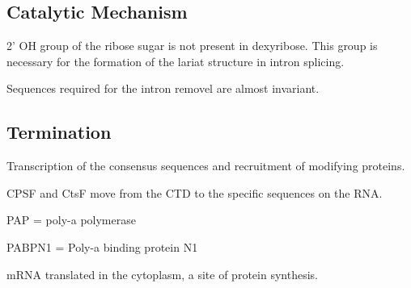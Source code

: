 \documentclass[11pt]{scrartcl}
\begin{document}
\subsection{Catalytic Mechanism}

2' OH group of the ribose sugar is not present in dexyribose. This
group is necessary for the formation of the lariat structure in intron
splicing.

Sequences required for the intron removel are almost invariant.

\subsection{Termination}

Transcription of the consensus sequences and recruitment of modifying
proteins.

CPSF and CtsF move from the CTD to the specific sequences on the RNA.

PAP = poly-a polymerase

PABPN1 = Poly-a binding protein N1

mRNA translated in the cytoplasm, a site of protein synthesis.
\end{document}
